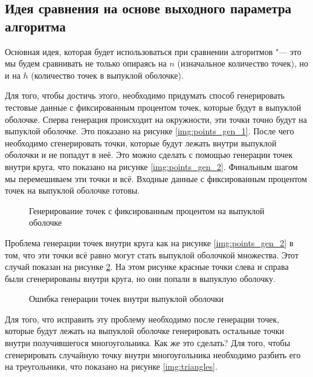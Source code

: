 \subsection{Идея сравнения на основе выходного параметра алгоритма}

Основная идея, которая будет использоваться при сравнении алгоритмов "--- это мы будем сравнивать не только опираясь на $n$ (изначальное количество точек), но и на $h$ (количество точек в выпуклой оболочке).

Для того, чтобы достичь этого, необходимо придумать способ генерировать тестовые данные с фиксированным процентом точек, которые будут в выпуклой оболочке. Сперва генерация происходит на окружности, эти точки точно будут на выпуклой оболочке. Это показано на рисунке \ref{img:points_gen_1}. После чего необходимо сгенерировать точки, которые будут лежать внутри выпуклой оболочки и не попадут в неё. Это можно сделать с помощью генерации точек внутри круга, что показано на рисунке \ref{img:points_gen_2}. Финальным шагом мы перемешиваем эти точки и всё. Входные данные с фиксированным процентом точек на выпуклой оболочке готовы.

\begin{figure}
	{\centering
		\hfill
		\subbottom[\label{img:points_gen_1}]{%
			}
		\hfill
		\subbottom[\label{img:points_gen_2}]{%
			}
		\hfill
	}
	\caption{Генерирование точек с фиксированным процентом на выпуклой оболочке}
	\label{img:points_gen}
\end{figure}

Проблема генерации точек внутри круга как на рисунке \ref{img:points_gen_2} в том, что эти точки всё равно могут стать выпуклой оболочкой множества. Этот случай показан на рисунке \ref{img:gen_error}. На этом рисунке красные точки слева и справа были сгенерированы внутри круга, но они попали в выпуклую оболочку.

\begin{figure}
	\centering
	
	\caption{Ошибка генерации точек внутри выпуклой оболочки}
	\label{img:gen_error}
\end{figure}

Для того, что исправить эту проблему необходимо после генерации точек, которые будут лежать на выпуклой оболочке генерировать остальные точки внутри получившегося многоугольника. Как же это сделать? Для того, чтобы сгенерировать случайную точку внутри многоугольника необходимо разбить его на треугольники, что показано на рисунке \ref{img:triangles}.

